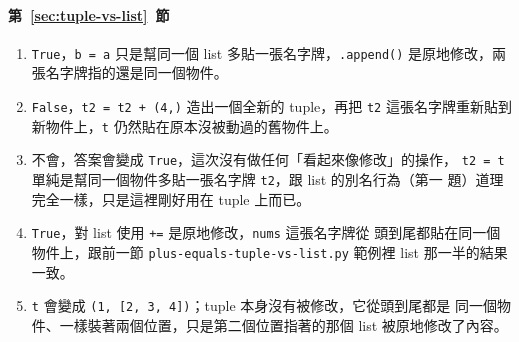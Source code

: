 \paragraph{第~\ref{sec:tuple-vs-list}~節}
\begin{enumerate}
\item \texttt{True}，\texttt{b = a} 只是幫同一個 list 多貼一張名字牌，\texttt{.append()}
是原地修改，兩張名字牌指的還是同一個物件。
\item \texttt{False}，\texttt{t2 = t2 + (4,)} 造出一個全新的 tuple，再把 \texttt{t2}
這張名字牌重新貼到新物件上，\texttt{t} 仍然貼在原本沒被動過的舊物件上。
\item 不會，答案會變成 \texttt{True}，這次沒有做任何「看起來像修改」的操作，
\texttt{t2 = t} 單純是幫同一個物件多貼一張名字牌 \texttt{t2}，跟 list 的別名行為（第一
題）道理完全一樣，只是這裡剛好用在 tuple 上而已。
\item \texttt{True}，對 list 使用 \texttt{+=} 是原地修改，\texttt{nums} 這張名字牌從
頭到尾都貼在同一個物件上，跟前一節 \texttt{plus-equals-tuple-vs-list.py} 範例裡 list
那一半的結果一致。
\item \texttt{t} 會變成 \texttt{(1, [2, 3, 4])}；tuple 本身沒有被修改，它從頭到尾都是
同一個物件、一樣裝著兩個位置，只是第二個位置指著的那個 list 被原地修改了內容。
\end{enumerate}
